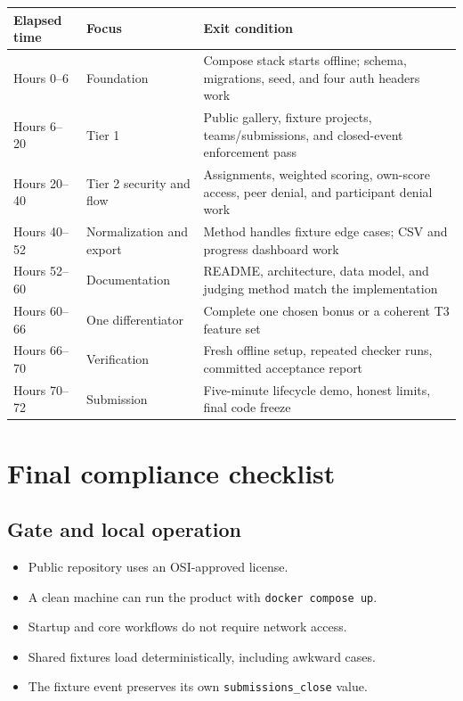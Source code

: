 \documentclass[11pt]{article}
\newcommand{\checkbox}{\textcolor{DeepBlue}{\ding{113}}}
\begin{document}
\begin{tabularx}{\linewidth}{@{}L{29mm}L{37mm}Y@{}}
\toprule
\textbf{Elapsed time} & \textbf{Focus} & \textbf{Exit condition}\\
\midrule
Hours 0--6 & Foundation & Compose stack starts offline; schema, migrations, seed, and four auth headers work\\
Hours 6--20 & Tier 1 & Public gallery, fixture projects, teams/submissions, and closed-event enforcement pass\\
Hours 20--40 & Tier 2 security and flow & Assignments, weighted scoring, own-score access, peer denial, and participant denial work\\
Hours 40--52 & Normalization and export & Method handles fixture edge cases; CSV and progress dashboard work\\
Hours 52--60 & Documentation & README, architecture, data model, and judging method match the implementation\\
Hours 60--66 & One differentiator & Complete one chosen bonus or a coherent T3 feature set\\
Hours 66--70 & Verification & Fresh offline setup, repeated checker runs, committed acceptance report\\
Hours 70--72 & Submission & Five-minute lifecycle demo, honest limits, final code freeze\\
\bottomrule
\end{tabularx}

\section{Final compliance checklist}

\subsection{Gate and local operation}

\begin{itemize}
  \item[\checkbox] Public repository uses an OSI-approved license.
  \item[\checkbox] A clean machine can run the product with \texttt{docker compose up}.
  \item[\checkbox] Startup and core workflows do not require network access.
  \item[\checkbox] Shared fixtures load deterministically, including awkward cases.
  \item[\checkbox] The fixture event preserves its own \texttt{submissions\_close} value.
\end{itemize}
\end{document}
